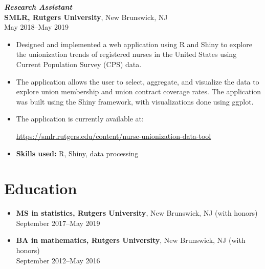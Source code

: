 \documentclass[letterpaper,12pt]{article}
\begin{document}
\textit{\textbf{Research Assistant}} \\
\textbf{SMLR, Rutgers University}, New Brunswick, NJ \\
May 2018--May 2019
\begin{itemize}
  \item Designed and implemented a web application using R and Shiny to explore
        the unionization trends of registered nurses in the United States using
        Current Population Survey (CPS) data.
  \item The application allows the user to select, aggregate, and visualize the
        data to explore union membership and union contract coverage rates. The
        application was built using the Shiny framework, with visualizations
        done using ggplot.
  \item The application is currently available at:
        \begin{center}
          \url{https://smlr.rutgers.edu/content/nurse-unionization-data-tool}
        \end{center}
  \item \textbf{Skills used:} R, Shiny, data processing
\end{itemize}

\section*{Education}

\begin{itemize}
  \item \textbf{MS in statistics, Rutgers University}, New Brunswick, NJ (with
        honors) \\
        September 2017--May 2019

  \item \textbf{BA in mathematics, Rutgers University}, New Brunswick, NJ (with
        honors) \\
        September 2012--May 2016
\end{itemize}
\end{document}
